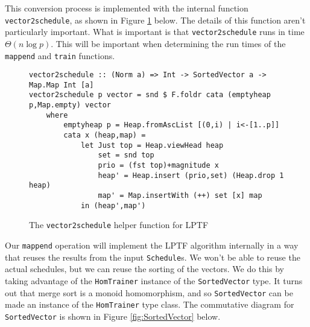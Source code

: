\documentclass[tikz]{tmr}
\newcommand\h{\lstinline}
\newcommand\+{\mdoubleplus}
\begin{document}
\begin{figure}[H]
{
\vspace{0.1in}
}
\end{figure}

This conversion process is implemented with the internal function \h{vector2schedule}, as shown in Figure \ref{code:vector2schedule} below.
The details of this function aren't particularly important.
What is important is that \h{vector2schedule} runs in time $\Theta(n\log p)$.
This will be important when determining the run times of the \h{mappend} and \h{train} functions.

\begin{figure}[H]
\caption{The \h{vector2schedule} helper function for LPTF}
\label{code:vector2schedule}
\begin{lstlisting}
vector2schedule :: (Norm a) => Int -> SortedVector a -> Map.Map Int [a]
vector2schedule p vector = snd $ F.foldr cata (emptyheap p,Map.empty) vector
    where
        emptyheap p = Heap.fromAscList [(0,i) | i<-[1..p]]
        cata x (heap,map) = 
            let Just top = Heap.viewHead heap
                set = snd top
                prio = (fst top)+magnitude x
                heap' = Heap.insert (prio,set) (Heap.drop 1 heap)
                map' = Map.insertWith (++) set [x] map
            in (heap',map')

\end{lstlisting}
\end{figure}

Our \h{mappend} operation will implement the LPTF algorithm internally in a way that reuses the results from the input \h{Schedule}s.
We won't be able to reuse the actual schedules, but we can reuse the sorting of the vectors.
We do this by taking advantage of the \h{HomTrainer} instance of the \h{SortedVector} type.
It turns out that merge sort is a monoid homomorphism, and so \h{SortedVector} can be made an instance of the \h{HomTrainer} type class.
The commutative diagram for \h{SortedVector} is shown in Figure \ref{fig:SortedVector} below.
\end{document}
